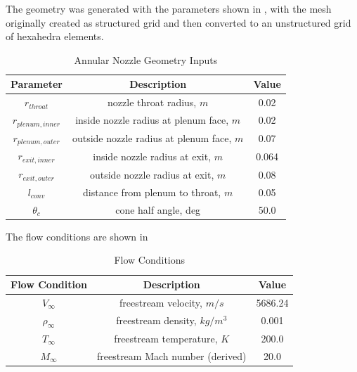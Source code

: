 The geometry was generated with the parameters shown in ,
with the mesh originally created as structured grid and then converted to an
unstructured grid of hexahedra elements.
\begin{table}[h]
  \centering
  \begin{tabular}{c|c|c}
    Parameter & Description & Value \\
    \hline
    $r_{throat}$       &   nozzle throat radius, $m$                 & 0.02 \\
    $r_{plenum,inner}$ &   inside nozzle radius at plenum face, $m$  & 0.02 \\
    $r_{plenum,outer}$ &   outside nozzle radius at plenum face, $m$ & 0.07 \\
    $r_{exit,inner}$   &   inside nozzle radius at exit, $m$         & 0.064 \\
    $r_{exit,outer}$   &   outside nozzle radius at exit, $m$        & 0.08 \\
    $l_{conv}$         &   distance from plenum to throat, $m$       & 0.05 \\
    $\theta_c$         &   cone half angle, deg                      & 50.0
  \end{tabular}
  \caption{Annular Nozzle Geometry Inputs}
  \label{tab:annular-geom}
\end{table}
The flow conditions are shown in 
\begin{table}[!h]
  \centering
  \begin{tabular}{c|c|c}
    Flow Condition & Description & Value \\
    \hline
    $V_{\infty}$    & freestream velocity, $m/s$        & 5686.24 \\
    $\rho_{\infty}$ & freestream density, $kg/m^3$      & 0.001 \\
    $T_{\infty}$    & freestream temperature, $K$       & 200.0 \\
    $M_{\infty}$    & freestream Mach number (derived)  & 20.0
  \end{tabular}
  \caption{Flow Conditions}
  \label{tab:flow-conditions}
\end{table}

